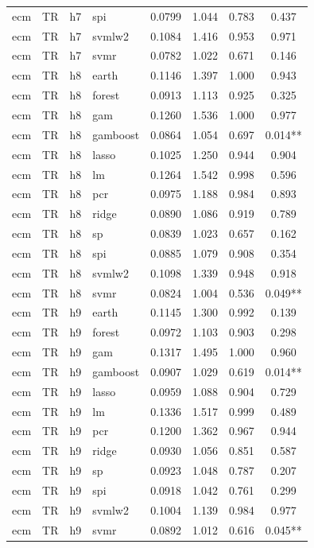\begin{ThreePartTable}
\begin{longtable}[t]{llclcccc}
ecm & TR & h7 & spi & 0.0799 & 1.044 & 0.783 & 0.437\\
ecm & TR & h7 & svmlw2 & 0.1084 & 1.416 & 0.953 & 0.971\\
ecm & TR & h7 & svmr & 0.0782 & 1.022 & 0.671 & 0.146\\
\addlinespace
ecm & TR & h8 & earth & 0.1146 & 1.397 & 1.000 & 0.943\\
ecm & TR & h8 & forest & 0.0913 & 1.113 & 0.925 & 0.325\\
ecm & TR & h8 & gam & 0.1260 & 1.536 & 1.000 & 0.977\\
ecm & TR & h8 & gamboost & 0.0864 & 1.054 & 0.697 & 0.014**\\
ecm & TR & h8 & lasso & 0.1025 & 1.250 & 0.944 & 0.904\\
ecm & TR & h8 & lm & 0.1264 & 1.542 & 0.998 & 0.596\\
ecm & TR & h8 & pcr & 0.0975 & 1.188 & 0.984 & 0.893\\
ecm & TR & h8 & ridge & 0.0890 & 1.086 & 0.919 & 0.789\\
ecm & TR & h8 & sp & 0.0839 & 1.023 & 0.657 & 0.162\\
ecm & TR & h8 & spi & 0.0885 & 1.079 & 0.908 & 0.354\\
ecm & TR & h8 & svmlw2 & 0.1098 & 1.339 & 0.948 & 0.918\\
ecm & TR & h8 & svmr & 0.0824 & 1.004 & 0.536 & 0.049**\\
\addlinespace
ecm & TR & h9 & earth & 0.1145 & 1.300 & 0.992 & 0.139\\
ecm & TR & h9 & forest & 0.0972 & 1.103 & 0.903 & 0.298\\
ecm & TR & h9 & gam & 0.1317 & 1.495 & 1.000 & 0.960\\
ecm & TR & h9 & gamboost & 0.0907 & 1.029 & 0.619 & 0.014**\\
ecm & TR & h9 & lasso & 0.0959 & 1.088 & 0.904 & 0.729\\
ecm & TR & h9 & lm & 0.1336 & 1.517 & 0.999 & 0.489\\
ecm & TR & h9 & pcr & 0.1200 & 1.362 & 0.967 & 0.944\\
ecm & TR & h9 & ridge & 0.0930 & 1.056 & 0.851 & 0.587\\
ecm & TR & h9 & sp & 0.0923 & 1.048 & 0.787 & 0.207\\
ecm & TR & h9 & spi & 0.0918 & 1.042 & 0.761 & 0.299\\
ecm & TR & h9 & svmlw2 & 0.1004 & 1.139 & 0.984 & 0.977\\
ecm & TR & h9 & svmr & 0.0892 & 1.012 & 0.616 & 0.045**\\

\end{longtable}
\end{ThreePartTable}
